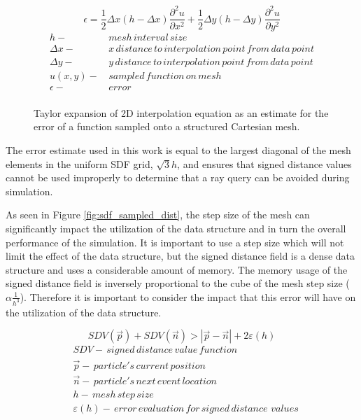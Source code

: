 \begin{figure}[H]
  \begin{equation}
    \epsilon = \frac{1}{2} \Delta x (h-\Delta x) \frac{\partial^2 u}{\partial x^2} + \frac{1}{2} \Delta y (h-\Delta y)  \frac{\partial^2 u}{\partial y^2}
  \end{equation}
  \begin{align*}
    h - & \, mesh\, interval\, size \\
    \Delta x - & \, x\, distance\, to\, interpolation\, point\, from\, data\, point \\
    \Delta y - & \, y\, distance\, to\, interpolation\, point\, from\, data\, point \\
    u(x,y) - &\, sampled\, function\, on\, mesh \\
    \epsilon - & \, error \\
  \end{align*}
  \caption[Taylor expansion of a bi-linear interpolation.]{Taylor expansion of 2D
    interpolation equation as an estimate for the error of a function sampled
    onto a structured Cartesian mesh.}
  \label{fig:interpolation_err_2d}
\end{figure}

The error estimate used in this work is equal to the largest diagonal of the
mesh elements in the uniform SDF grid, $\sqrt{3}h$, and ensures that signed
distance values cannot be used improperly to determine that a ray query can be
avoided during simulation.


As seen in Figure \ref{fig:sdf_sampled_dist}, the step size of the mesh can
significantly impact the utilization of the data structure and in turn the
overall performance of the simulation. It is important to use a step size which
will not limit the effect of the data structure, but the signed
distance field is a dense data structure and uses a considerable amount of
memory. The memory usage of the signed distance field is inversely proportional
to the cube of the mesh step size ($\alpha \frac{1}{h^{3}}$). Therefore it is
important to consider the impact that this error will have on the utilization
of the data structure.

\begin{equation}
  SDV(\vec{p}) + SDV(\vec{n}) > |\vec{p}-\vec{n}| + 2\varepsilon(h)
  \label{eq:condition}
\end{equation}
\begin{align*}
 &SDV - \, signed \, distance \, value \, function \\
 &\vec{p} - \, particle's \, current \, position \\
 &\vec{n} - \, particle's \, next \, event \, location \\
 &h - \, mesh \, step \, size \\
 &\varepsilon(h) - \, error \, evaluation \, for \, signed \, distance \, \, values \\
\end{align*}

